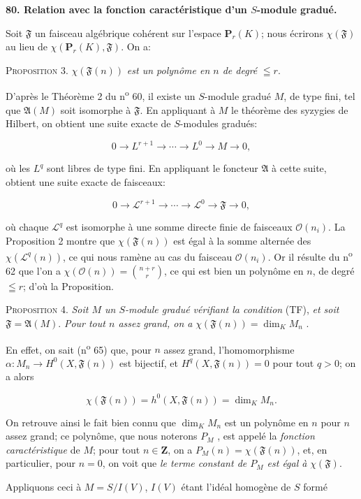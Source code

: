 \textbf{80. Relation avec la fonction caractéristique d'un $S$-module gradué.}

Soit $\mathfrak{F}$ un faisceau algébrique cohérent sur l'espace $\mathbf{P}_r(K)$; nous écrirons $\chi(\mathfrak{F})$ au lieu de $\chi(\mathbf{P}_r(K), \mathfrak{F})$. On a:

\textsc{Proposition} 3. $\chi(\mathfrak{F}(n))$ \textit{est un polynôme en $n$ de degré} $\leqq r$.

D'après le Théorème 2 du n\textsuperscript{o} 60, il existe un $S$-module gradué $M$, de type fini, tel que $\mathfrak{A}(M)$ soit isomorphe à $\mathfrak{F}$. En appliquant à $M$ le théorème des syzygies de Hilbert, on obtient une suite exacte de $S$-modules gradués:

\begin{equation*}
0 \rightarrow L^{r+1} \rightarrow \cdots \rightarrow L^0 \rightarrow M \rightarrow 0,
\end{equation*}

où les $L^q$ sont libres de type fini. En appliquant le foncteur $\mathfrak{A}$ à cette suite, obtient une suite exacte de faisceaux:

\begin{equation*}
0 \rightarrow \mathcal{L}^{r+1} \rightarrow \cdots \rightarrow \mathcal{L}^0 \rightarrow \mathfrak{F} \rightarrow 0,
\end{equation*}

où chaque $\mathcal{L}^q$ est isomorphe à une somme directe finie de faisceaux $\mathcal{O}(n_i)$. La Proposition 2 montre que $\chi(\mathfrak{F}(n))$ est égal à la somme alternée des $\chi(\mathcal{L}^q(n))$, ce qui nous ramène au cas du faisceau $\mathcal{O}(n_i)$. Or il résulte du n\textsuperscript{o} 62 que l'on a $\chi(\mathcal{O}(n)) = \binom{n + r}{r}$, ce qui est bien un polynôme en $n$, de degré $\leqq r$; d'où la Proposition.

\textsc{Proposition} 4. \textit{Soit $M$ un $S$-module gradué vérifiant la condition} (TF), \textit{et soit} $\mathfrak{F} = \mathfrak{A}(M)$. \textit{Pour tout $n$ assez grand, on a} $\chi(\mathfrak{F}(n)) = \dim_K M_n$ .

En effet, on sait (n\textsuperscript{o} 65) que, pour $n$ assez grand, l'homomorphisme $\alpha: M_n \rightarrow H^0(X, \mathfrak{F}(n))$ est bijectif, et $H^q(X, \mathfrak{F}(n)) = 0$ pour tout $q > 0$; on a alors

\begin{equation*}
\chi(\mathfrak{F}(n)) = h^0(X, \mathfrak{F}(n)) = \dim_K M_n .
\end{equation*}

On retrouve ainsi le fait bien connu que $\dim_K M_n$ est un polynôme en $n$ pour $n$ assez grand; ce polynôme, que nous noterons $P_M$ , est appelé la \textit{fonction caractéristique} de $M$; pour tout $n \in \mathbf{Z}$, on a $P_M(n) = \chi(\mathfrak{F}(n))$, et, en particulier, pour $n = 0$, on voit que \textit{le terme constant de $P_M$ est égal à} $\chi(\mathfrak{F})$.

Appliquons ceci à $M = S/I(V)$, $I(V)$ étant l'idéal homogène de $S$ formé
